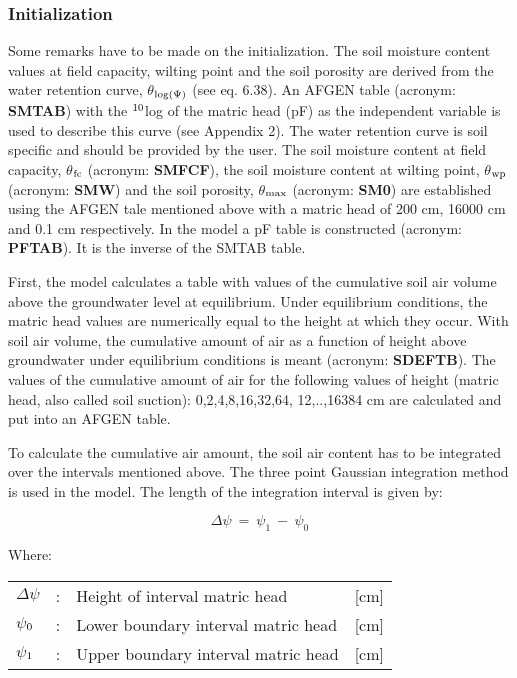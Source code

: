 \subsubsection{Initialization}
Some remarks have to be made on the initialization. The soil moisture content values at
field capacity, wilting point and the soil porosity are derived from the water retention
curve, $\theta$$_{{\rm log(}{\rm \Psi}{)}}$ (see eq. 6.38). An AFGEN table (acronym: 
{\bf SMTAB}) with the $^{{\rm 10}}$log of the
matric head (pF) as the independent variable is used to describe this curve (see Appendix
2). The water retention curve is soil specific and should be provided by the user. The soil
moisture content at field capacity, {\bf $\theta$$_{{\rm fc}}$} (acronym: {\bf SMFCF}), 
the soil moisture content at
wilting point, {\bf $\theta$$_{{\rm wp}}$} (acronym: {\bf SMW}) and the soil porosity, 
{\bf $\theta$$_{{\rm max}}$} (acronym: {\bf SM0}) are
established using the AFGEN tale mentioned above with a matric head of 200 cm, 16000
cm and 0.1 cm respectively. In the model a pF table is constructed (acronym: {\bf PFTAB}).
It is the inverse of the SMTAB table.

First, the model calculates a table with values of the cumulative soil air volume above the
ground\-water level at equilibrium. Under equilibrium conditions, the matric head values
are numerically equal to the height at which they occur. With soil air volume, the
cumulat\-ive amount of air as a function of height above groundwater under equilibrium
conditions is meant (acronym: {\bf SDEFTB}). The values of the cumulative amount of air for
the following values of height (matric head, also called soil suction): 0,2,4,8,16,32,64,
12,..,16384 cm are calculated and put into an AFGEN table. 

To calculate the cumulative air amount, the soil air content has to be integrated over the
intervals mentioned above. The three point Gaussian integration method is used in the
model. The length of the integration interval is given by:

\begin{equation}
\Delta  \psi ~=~ \psi _{1} ~-~ \psi _{0} 
\end{equation}

Where:\\[5pt]
\begin{tabularx}{\textwidth}{llXr}
$\Delta$$\psi$ &:& Height of interval matric head  & [cm]\\
$\psi$$_{{\rm 0}}$ &:& Lower boundary interval matric head  & [cm]\\
$\psi$$_{{\rm 1}}$ &:& Upper boundary interval matric head  & [cm]\\
\end{tabularx}

